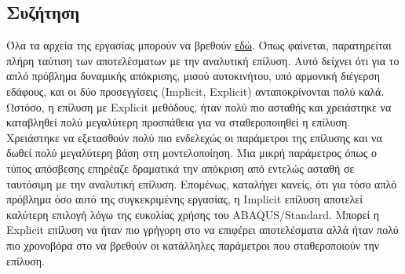 \documentclass{article}
\begin{document}
\subsection{Συζήτηση}
Όλα τα αρχεία της εργασίας μπορούν να βρεθούν \href{https://github.com/vasilepi/meng/tree/cae2-4/CAE2/4th}{εδώ}.
Όπως φαίνεται, παρατηρείται πλήρη ταύτιση των αποτελέσματων με την αναλυτική επίλυση. Αυτό δείχνει ότι για το απλό πρόβλημα δυναμικής απόκρισης, μισού αυτοκινήτου, υπό αρμονική διέγερση εδάφους, και οι δύο προσεγγίσεις (Implicit, Explicit) ανταποκρίνονται πολύ καλά. Ωστόσο, η επίλυση με Explicit μεθόδους, ήταν πολύ πιο ασταθής και χρειάστηκε να καταβληθεί πολύ μεγαλύτερη προσπάθεια για να σταθεροποιηθεί η επίλυση. Χρειάστηκε να εξετασθούν πολύ πιο ενδελεχώς οι παράμετροι της επίλυσης και να δωθεί πολύ μεγαλύτερη βάση στη μοντελοποίηση. Μια μικρή παράμετρος όπως ο τύπος απόσβεσης επηρέαζε δραματικά την απόκριση από εντελώς ασταθή σε ταυτόσιμη με την αναλυτική επίλυση. Επομένως, καταλήγει κανείς, ότι για τόσο απλό πρόβλημα όσο αυτό της συγκεκριμένης εργασίας, η Implicit επίλυση αποτελεί καλύτερη επιλογή λόγω της ευκολίας χρήσης του ABAQUS/Standard. Μπορεί η Explicit επίλυση να ήταν πιο γρήγορη στο να επιφέρει αποτελέσματα αλλά ήταν πολύ πιο χρονοβόρα στο να βρεθούν οι κατάλληλες παράμετροι που σταθεροποιούν την επίλυση.













\listoffigures
\listoftables
\end{document}

